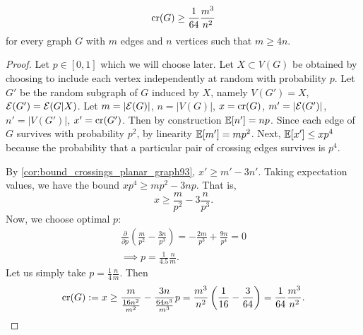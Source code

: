 \begin{theorem}
\label{thm:crossing_number_lemma}

\[
\operatorname{cr}(G) \geq \frac{1}{64}\frac{m^3}{n^2}
\]
for every graph $G$ with $m$ edges and $n$ vertices such that $m\geq 4n$.
\end{theorem}
\begin{proof}	
Let $p \in [0,1]$ which we will choose later. Let $X\subset V(G)$ be obtained by choosing to include each vertex independently at random with probability $p$. Let $G'$ be the random subgraph of $G$ induced by $X$, namely $V(G') = X$, $\mathcal{E}(G') = \mathcal{E}(G| X)$. Let $m = |\mathcal{E}(G)|$, $n= |V(G)|$, $x= \operatorname{cr}(G)$, $m' = |\mathcal{E}(G')|$, $n' = |V(G')|$, $x' = \operatorname{cr}(G')$. Then by construction $\mathbb{E}[n'] = np$. Since each edge of $G$ survives with probability $p^2$, by linearity $\mathbb{E}[m']= mp^2$. Next, $\mathbb{E}[x'] \leq xp^4$ because the probability that a particular pair of crossing edges survives is $p^4$.

By \cref{cor:bound_crossings_planar_graph93}, $x'\geq m' - 3n'$. Taking expectation values, we have the bound $x p^4 \geq mp^2 - 3np$. That is,
\[
x\geq \frac{m}{p^2} - 3 \frac{n}{p^3}.
\]
Now, we choose optimal $p$:
\begin{gather*}
 \frac{\partial}{\partial p} \left( \frac{m}{p^2}- \frac{3n}{ p^3} \right) = - \frac{2m}{p^3} + \frac{9n}{p^4} = 0 \\
 \implies p=\frac{1}{4.5}\frac{n}{m}.
\end{gather*}
Let us simply take $p = \frac{1}{4}\frac{n}{m}.$ Then
\begin{gather*}
\operatorname{cr} (G):=x \geq \frac{m}{\frac{16 n^2}{m^2}} - \frac{3n}{\frac{64 n^3}{m^3}}p = \frac{m^3}{n^2} \left( \frac{1}{16} - \frac{3}{64} \right) = \frac{1}{64}\frac{m^3}{n^2}.
\end{gather*}
\end{proof}

